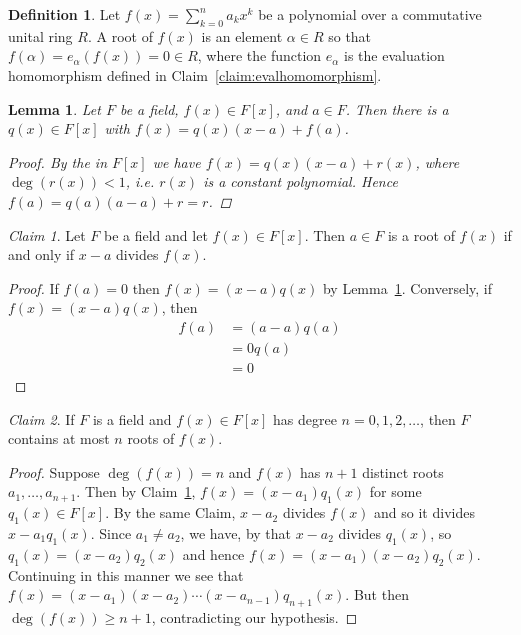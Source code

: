 \documentclass[12pt,letterpaper,DIV=11,final]{scrartcl}
\theoremstyle{plain}
\newtheorem{lemma}[theorem]{Lemma}
\theoremstyle{definition}
\newtheorem{definition}{Definition}[section]
\theoremstyle{remark}
\newtheorem{claim}{Claim}
\begin{document}
\begin{definition}
  Let $f(x) = \sum_{k = 0}^n a_k x^k$ be a polynomial over a commutative unital ring $R$.
  A root of $f(x)$ is an element $\alpha \in R$ so that $f(\alpha) = e_\alpha(f(x)) = 0 \in R$,
  where the function $e_\alpha$ is the evaluation homomorphism defined in Claim~\ref{claim:evalhomomorphism}.
\end{definition}

\begin{lemma}\label{lemma:field_qx}
  Let $F$ be a field, $f(x) \in F[x]$, and $a \in F$.
  Then there is a $q(x) \in F[x]$ with $f(x) = q(x) (x - a) + f(a)$.

  \begin{proof}
    By the  in $F[x]$ we have $f(x) = q(x) (x - a) + r(x)$, where $\deg(r(x)) < 1$, i.e. $r(x)$ is a constant polynomial.
    Hence $f(a) = q(a) (a - a) + r = r$.
  \end{proof}
\end{lemma}

\begin{claim}\label{claim:poly_rootdiv}
  Let $F$ be a field and let $f(x) \in F[x]$.
  Then $a \in F$ is a root of $f(x)$ if and only if $x - a$ divides $f(x)$.

  \begin{proof}
    If $f(a) = 0$ then $f(x) = (x - a) q(x)$ by Lemma~\ref{lemma:field_qx}.
    Conversely, if $f(x) = (x - a) q(x)$, then
    \begin{align*}
      f(a) &= (a - a) q(a) \\
           &= 0 q(a) \\
           &= 0
    \end{align*}
  \end{proof}
\end{claim}

\begin{claim}
  If $F$ is a field and $f(x) \in F[x]$ has degree $n = 0, 1, 2, \dots$, then $F$ contains at most $n$ roots of $f(x)$.

  \begin{proof}
    Suppose $\deg(f(x)) = n$ and $f(x)$ has $n + 1$ distinct roots $a_1, \dots, a_{n + 1}$.
    Then by Claim~\ref{claim:poly_rootdiv}, $f(x) = (x - a_1) q_1(x)$ for some $q_1(x) \in F[x]$.
    By the same Claim, $x - a_2$ divides $f(x)$ and so it divides $x - a_1 q_1(x)$.
    Since $a_1 \neq a_2$, we have, by  that $x - a_2$ divides $q_1(x)$, so $q_1(x) = (x - a_2) q_2(x)$ and hence $f(x) = (x - a_1) (x - a_2) q_2(x)$.
    Continuing in this manner we see that $f(x) = (x - a_1) (x - a_2) \cdots (x - a_{n - 1}) q_{n + 1}(x)$.
    But then $\deg(f(x)) \geq n + 1$, contradicting our hypothesis.
  \end{proof}
\end{claim}
\end{document}
